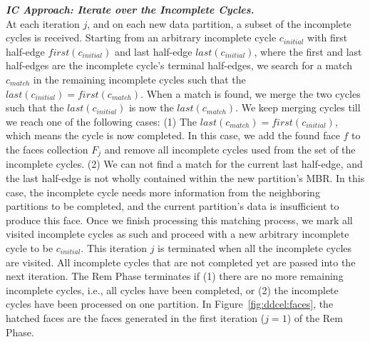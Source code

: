 \vspace{4pt}
\textit{\textbf{IC Approach: Iterate over the Incomplete Cycles.}}
\\
At each iteration $j$, and on each new data partition, a subset of the incomplete cycles is received. 
Starting from an arbitrary incomplete cycle $c_{initial}$ with first half-edge $first(c_{initial})$ and last half-edge $last(c_{initial})$, where the first and last half-edges are the incomplete cycle's terminal half-edges, we search for a match $c_{match}$ in the remaining incomplete cycles such that the $last(c_{initial}) = first(c_{match})$. When a match is found, we merge the two cycles such that the $last(c_{initial})$ is now the $last(c_{match})$. We keep merging cycles till we reach one of the following cases:
(1) The $last(c_{match}) = first(c_{initial})$, which means the cycle is now completed. In this case, we add the found face $f$ to the faces collection $F_j$ and remove all incomplete cycles used from the set of the incomplete cycles.
(2) We can not find a match for the current last half-edge, and the last half-edge is not wholly contained within the new partition's MBR. In this case, the incomplete cycle needs more information from the neighboring partitions to be completed, and the current partition's data is insufficient to produce this face.
Once we finish processing this matching process, we mark all visited incomplete cycles as such and proceed with a new arbitrary incomplete cycle to be $c_{initial}$.
This iteration $j$ is terminated when all the incomplete cycles are visited. All incomplete cycles that are not completed yet are passed into the next iteration.
The Rem Phase terminates if (1) there are no more remaining incomplete cycles, i.e., all cycles have been completed, or (2) the incomplete cycles have been processed on one partition.
In Figure~\ref{fig:ddcel:faces}, the hatched faces are the faces generated in the first iteration ($j=1$) of the Rem Phase.